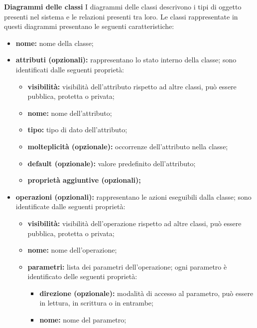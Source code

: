 						\textbf{Diagrammi delle classi}
						\newline
						\newline
						\hangindent=0.6cm I diagrammi delle classi descrivono i tipi di oggetto presenti nel sistema e le relazioni presenti tra loro.
						\newline
						\hangindent=0.6cm Le classi rappresentate in questi diagrammi presentano le seguenti caratteristiche:
						\begin{itemize}[leftmargin=1.5cm]
							\item \textbf{nome:} nome della classe;
							\item \textbf{attributi (opzionali):} rappresentano lo stato interno della classe; sono identificati dalle seguenti proprietà:
							\begin{itemize}
								\item \textbf{visibilità:} visibilità dell'attributo rispetto ad altre classi, può essere pubblica, protetta o privata;
								\item \textbf{nome:} nome dell'attributo;
								\item \textbf{tipo:} tipo di dato dell'attributo;
								\item \textbf{molteplicità (opzionale):} occorrenze dell'attributo nella classe;
								\item \textbf{default (opzionale):} valore predefinito dell'attributo;
								\item \textbf{proprietà aggiuntive (opzionali);}
							\end{itemize} 
							\item \textbf{operazioni (opzionali):} rappresentano le azioni eseguibili dalla classe; sono identificate dalle seguenti proprietà:
							\begin{itemize}
								\item \textbf{visibilità:} visibilità dell'operazione rispetto ad altre classi, può essere pubblica, protetta o privata;
								\item \textbf{nome:} nome dell'operazione;
								\item \textbf{parametri:} lista dei parametri dell'operazione; ogni parametro è identificato delle seguenti proprietà:
								\begin{itemize}
									\item \textbf{direzione (opzionale):} modalità di accesso al parametro, può essere in lettura, in scrittura o in entrambe;
									\item \textbf{nome:} nome del parametro;

\end{itemize}
\end{itemize}
\end{itemize}
